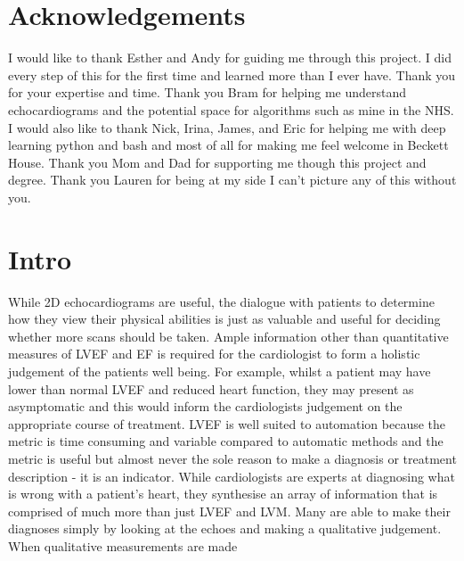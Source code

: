 \documentclass[12pt]{article}
\begin{document}
\section{Acknowledgements}
I would like to thank Esther and Andy for guiding me through this project.
I did every step of this for the first time and learned more than I ever have.
Thank you for your expertise and time.
Thank you Bram for helping me understand echocardiograms and the potential space for algorithms such as mine in the NHS.
I would also like to thank Nick, Irina, James, and Eric for helping me with deep learning python and bash and most of all for making me feel welcome in Beckett House.
Thank you Mom and Dad for supporting me though this project and degree.
Thank you Lauren for being at my side I can't picture any of this without you.

\section{Intro}
While 2D echocardiograms are useful, the dialogue with patients to determine how they view their physical abilities is just as valuable and useful for deciding whether more scans should be taken.
Ample information other than quantitative measures of LVEF and EF is required for the cardiologist to form a holistic judgement of the patients well being. For example, whilst a patient may have lower than normal LVEF and reduced heart function, they may present as asymptomatic and this would inform the cardiologists judgement on the appropriate course of treatment.
LVEF is well suited to automation because the metric is time consuming and variable compared to automatic methods and the metric is useful but almost never the sole reason to make a diagnosis or treatment description - it is an indicator.
While cardiologists are experts at diagnosing what is wrong with a patient's heart, they synthesise an array of information that is comprised of much more than just LVEF and LVM.
Many are able to make their diagnoses simply by looking at the echoes and making a qualitative judgement.
When qualitative measurements are made
\end{document}
